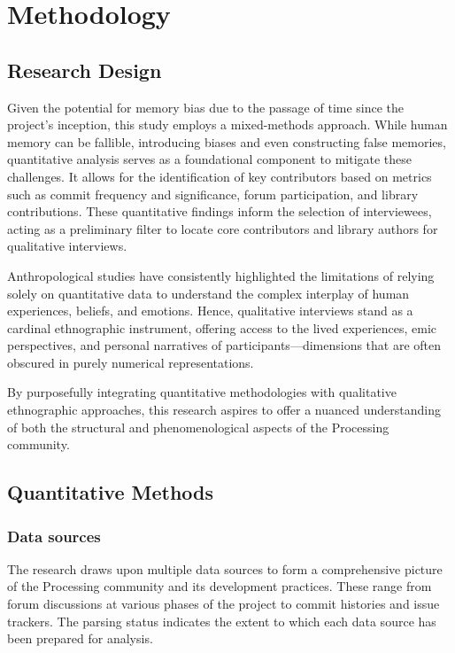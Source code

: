 
\section{Methodology}

\subsection{Research Design}
Given the potential for memory bias due to the passage of time since the project's inception, this study employs a mixed-methods approach. While human memory can be fallible, introducing biases and even constructing false memories, quantitative analysis serves as a foundational component to mitigate these challenges. It allows for the identification of key contributors based on metrics such as commit frequency and significance, forum participation, and library contributions. These quantitative findings inform the selection of interviewees, acting as a preliminary filter to locate core contributors and library authors for qualitative interviews.

Anthropological studies have consistently highlighted the limitations of relying solely on quantitative data to understand the complex interplay of human experiences, beliefs, and emotions. Hence, qualitative interviews stand as a cardinal ethnographic instrument, offering access to the lived experiences, emic perspectives, and personal narratives of participants—dimensions that are often obscured in purely numerical representations.

By purposefully integrating quantitative methodologies with qualitative ethnographic approaches, this research aspires to offer a nuanced understanding of both the structural and phenomenological aspects of the Processing community.

\subsection{Quantitative Methods}
\subsubsection*{Data sources}

The research draws upon multiple data sources to form a comprehensive picture of the Processing community and its development practices. These range from forum discussions at various phases of the project to commit histories and issue trackers. The parsing status indicates the extent to which each data source has been prepared for analysis. 
        

